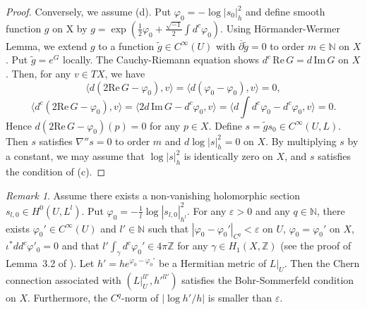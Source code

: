 \documentclass[12pt,oneside]{amsart}
\theoremstyle{plain}
\theoremstyle{definition}
\theoremstyle{remark}
\newtheorem{remark}{Remark}
\begin{document}
\begin{proof}
Conversely, we assume (d).  
Put $\varphi_{0} = -\log |s_{0}|^2_{h}$ and 
define smooth function $g$ on X by $g = \exp(\frac{1}{2}\varphi_{0}+\frac{\sqrt{-1}}{2}\int d^{c}\varphi_{0})$.  
Using H\"ormander-Wermer Lemma, we extend $g$ to a function $\tilde{g} \in C^{\infty}(U)$ with $\overline{\partial}\tilde{g} =0$ to order $m \in \mathbb{N}$ on $X$.  
Put $\tilde{g} = e^{G}$ locally.   
%
The Cauchy-Riemann equation shows $d^c\, \mathrm{Re}\, G = d\, \mathrm{Im}\, G$ on $X$.  
Then, for any $v \in TX$, we have 
\[
\langle d (2\mathrm{Re}\,G - \varphi_{0}), v \rangle = \langle d(\varphi_{0} - \varphi_{0}), v \rangle = 0, 
\]
\[
\langle d^c (2\mathrm{Re}\, G - \varphi_{0}), v\rangle = \langle2 d \,\mathrm{Im}\, G - d^c \varphi_{0}, v\rangle = \langle d \int d^c \varphi_{0} -d^c \varphi_{0}, v \rangle = 0.  
\]
Hence $d(2\mathrm{Re}\, G -\varphi_0)(p) = 0$ for any $p \in X$.  
Define $s = \tilde{g}s_{0} \in C^{\infty}(U, L)$. 
Then $s$ satisfies $\nabla''s = 0$ to order $m$ and 
$d \log |s|_{h}^2 = 0$ on $X$.  
By multiplying $s$ by a constant, we may assume that $\log |s|_{h}^2$ is identically zero on $X$, 
and $s$ satisfies the condition of (c).  
%
%
\end{proof}
\begin{remark}
Assume there exists a non-vanishing holomorphic section $s_{l, 0} \in H^{0}(U, L^l)$.  
Put $\varphi_{0} = -\frac{1}{l}\log |s_{l, 0}|^2_{h^l}$.  
For any $\varepsilon > 0$ and any $q \in \mathbb{N}$, there exists $\varphi_{0}' \in C^{\infty}(U)$ and $l' \in \mathbb{N}$ 
such that $|\varphi_{0}-\varphi_{0}'|_{C^{q}} < \varepsilon$ on $U$, $\varphi_{0} = \varphi_{0}'$ on $X$, $\iota^{*}dd^{c}\varphi'_{0} = 0$ and that $l'\int_{\gamma} d^c \varphi_{0}' \in 4\pi \mathbb{Z}$ for any $\gamma \in H_1(X, \mathbb{Z})$ (see the proof of Lemma~3.2 of \cite{Duv-Sib}).  
Let $h' = he^{\varphi_{0}-\varphi_{0}'}$ be a Hermitian metric of $L|_{U}$. 
Then the Chern connection 
associated with $(L|_{U}^{ll'}, h'^{ll'})$ satisfies the Bohr-Sommerfeld condition on $X$.  
Furthermore, the $C^q$-norm of $|\log h'/h|$ is smaller than $\varepsilon$.    
\end{remark}
\end{document}
